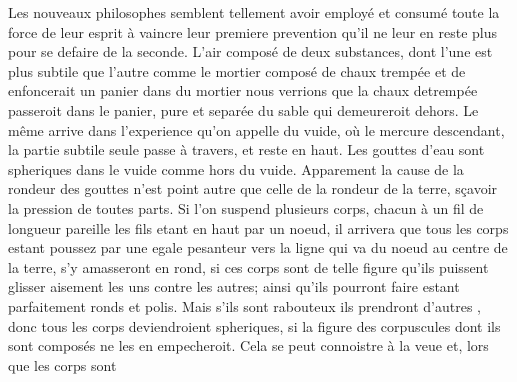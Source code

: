 \pend%
\pstart\noindent%
Les nouveaux philosophes semblent tellement avoir employ\'{e} et consum\'{e} toute la force de leur esprit \`{a} vaincre leur premiere prevention qu'il ne leur en reste plus pour se defaire de la seconde. L'air compos\'{e} de deux substances, dont l'une est plus subtile que l'autre comme le mortier\protect{}
compos\'{e} de chaux\protect{} tremp\'{e}e et de
enfoncerait un panier\protect{}
dans du mortier\protect{} nous verrions que la chaux\protect{} detremp\'{e}e passeroit dans le panier\protect{}, pure et separ\'{e}e du sable qui demeureroit dehors. Le même arrive dans l’experience\protect{} qu’on appelle du vuide,\protect{}
o\`{u} le mercure \protect{}
descendant, la partie subtile seule passe \`{a} travers, et reste en haut. Les gouttes\protect{}
d'eau\protect{} sont spheriques dans le vuide\protect{}
comme hors du vuide.\protect{}
Apparement la cause de la rondeur des gouttes\protect{}
n’est point autre que celle de la rondeur de la terre\protect{}, s\c{c}avoir la pression\protect{}
de toutes parts.
\pend%
\newpage%
\pstart%
Si l'on suspend plusieurs corps, chacun \`{a} un fil de longueur pareille les fils etant en haut par un noeud, il arrivera que tous les corps estant poussez par une egale pesanteur\protect{} vers la ligne qui va du noeud au centre de la terre\protect{}, s'y amasseront en rond, si ces corps sont de telle figure qu'ils puissent glisser aisement les uns contre les autres; ainsi qu'ils pourront faire estant parfaitement ronds et polis. Mais s'ils sont rabouteux ils prendront d'autres
, donc tous les corps deviendroient spheriques, si la figure des \protect{}
corpuscules dont ils sont compos\'{e}s ne les en empecheroit. Cela se peut connoistre \`{a} la veue et, lors que les corps sont
